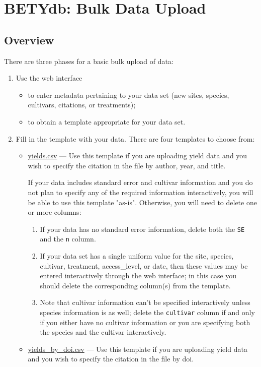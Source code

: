 \section{BETYdb: Bulk Data Upload}
\label{sec:bulk_upload}
\subsection{Overview}
 
There are three phases for a basic bulk upload of data: 

\begin{enumerate}

\item Use the web interface

      \begin{itemize}
    \item to enter metadata pertaining to your data set (new sites, species, cultivars, citations, or treatments);
    \item to obtain a template appropriate for your data set.
    \end{itemize}
\item Fill in the template with your data. There are four templates to choose from:
\begin{itemize}
\item \href{https://docs.google.com/spreadsheets/d/1maK1uKr6i9KERaYdU5zSiXcBndQoiG4Vgn2DTnqdfbA/export?format=csv&gid=0}{yields.csv} --- Use this template if you are uploading yield data and you wish to specify the citation in the file by author, year, and title.

If your data includes standard error and cultivar information and you do not plan to specify any of the required information interactively, you will be able to use this template "as-is".  Otherwise, you will need to delete one or more columns:
\begin{enumerate}
\item If your data has no standard error information, delete both the \verb|SE| and the \verb|n| column.
\item If your data set has a single uniform value for the site, species, cultivar, treatment, access\_level, or date, then these values may be entered interactively through the web interface; in this case you should delete the corresponding column(s) from the template. \item Note that cultivar information can't be specified interactively unless species information is as well; delete the \verb|cultivar| column if and only if you either have no cultivar information or you are specifying both the species and the cultivar interactively.
\end{enumerate}
\item \href{https://docs.google.com/spreadsheets/d/1ExLosMvX05jHWO9UYVE4Dxcl2ZbUgPc0KYoUPruaOtM/export?format=csv&gid=0}{yields\_by\_doi.csv} --- Use this template if you are uploading yield data and you wish to specify the citation in the file by doi.


\end{itemize}
\end{enumerate}

